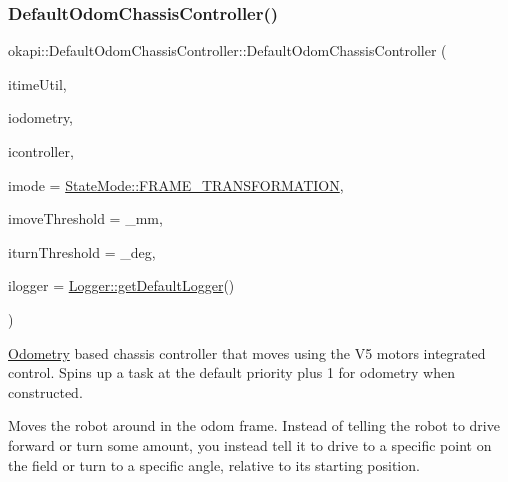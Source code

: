 \subsubsection{\texorpdfstring{DefaultOdomChassisController()}{DefaultOdomChassisController()}\hspace{0.1cm}{\footnotesize\ttfamily [1/3]}}
{\footnotesize\ttfamily okapi\+::\+Default\+Odom\+Chassis\+Controller\+::\+Default\+Odom\+Chassis\+Controller (\begin{DoxyParamCaption}\item[{const \mbox{\hyperlink{classokapi_1_1TimeUtil}{Time\+Util}} \&}]{itime\+Util,  }\item[{std\+::unique\+\_\+ptr$<$ \mbox{\hyperlink{classokapi_1_1Odometry}{Odometry}} $>$}]{iodometry,  }\item[{std\+::shared\+\_\+ptr$<$ \mbox{\hyperlink{classokapi_1_1ChassisController}{Chassis\+Controller}} $>$}]{icontroller,  }\item[{const \mbox{\hyperlink{namespaceokapi_af37fbd761bd859a00ff4dd4a87dd8c07}{State\+Mode}} \&}]{imode = {\ttfamily \mbox{\hyperlink{namespaceokapi_af37fbd761bd859a00ff4dd4a87dd8c07ad5ed7666e5cebf60d3af20a5a46edf3b}{State\+Mode\+::\+F\+R\+A\+M\+E\+\_\+\+T\+R\+A\+N\+S\+F\+O\+R\+M\+A\+T\+I\+ON}}},  }\item[{Q\+Length}]{imove\+Threshold = {\+\_\+mm},  }\item[{Q\+Angle}]{iturn\+Threshold = {\+\_\+deg},  }\item[{std\+::shared\+\_\+ptr$<$ \mbox{\hyperlink{classokapi_1_1Logger}{Logger}} $>$}]{ilogger = {\ttfamily \mbox{\hyperlink{classokapi_1_1Logger_a5053cf778b4b55acba788a3797dc96d2}{Logger\+::get\+Default\+Logger}}()} }\end{DoxyParamCaption})}

\mbox{\hyperlink{classokapi_1_1Odometry}{Odometry}} based chassis controller that moves using the V5 motor\textquotesingle{}s integrated control. Spins up a task at the default priority plus 1 for odometry when constructed.

Moves the robot around in the odom frame. Instead of telling the robot to drive forward or turn some amount, you instead tell it to drive to a specific point on the field or turn to a specific angle, relative to its starting position.



